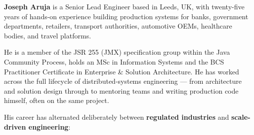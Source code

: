 \documentclass[
  11pt,
  british,
  oneside]{book}
\begin{document}
\textbf{Joseph Aruja} is a Senior Lead Engineer based in Leeds, UK, with
twenty-five years of hands-on experience building production systems for
banks, government departments, retailers, transport authorities,
automotive OEMs, healthcare bodies, and travel platforms.

He is a member of the JSR 255 (JMX) specification group within the Java
Community Process, holds an MSc in Information Systems and the BCS
Practitioner Certificate in Enterprise \& Solution Architecture. He has
worked across the full lifecycle of distributed-systems engineering ---
from architecture and solution design through to mentoring teams and
writing production code himself, often on the same project.

His career has alternated deliberately between \textbf{regulated
industries} and \textbf{scale-driven engineering}:
\end{document}
